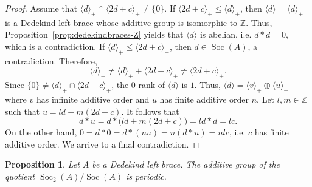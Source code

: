 \documentclass[12pt, a4paper, english]{article}
\newtheorem{proposicio}[teorema]{Proposition}
\theoremstyle{definition}
\DeclareMathOperator{\Soc}{Soc}
\begin{document}
\begin{proof}
Assume that $\langle d \rangle_+ \cap \langle 2d+c\rangle_+ \neq \{0\}$. If $\langle 2d + c \rangle_+ \leq \langle d \rangle_+$, then $\langle d \rangle = \langle d \rangle_+$ is a Dedekind left brace whose additive group is isomorphic to $\mathbb{Z}$. Thus, Proposition~\ref{prop:dedekindbraces-Z} yields that $\langle d \rangle$ is abelian, i.e. $d \ast d = 0$, which is a contradiction. If $\langle d \rangle_+ \leq \langle 2d +c \rangle_+$, then $d \in \Soc(A)$, a contradiction. Therefore, 
\[ \langle d \rangle_+ \neq \langle d \rangle_+ + \langle 2d+c \rangle_+ \neq \langle 2d+c \rangle_+.\] Since $\{0\} \neq \langle d \rangle_+ \cap \langle 2d+c \rangle_+$, the $0$-rank of $\langle d \rangle$ is $1$. Thus, $ \langle d \rangle = \langle v \rangle_+ \oplus \langle u \rangle_+$ where $v$ has infinite additive order and $u$ has finite additive order $n$. Let $l,m \in \mathbb{Z}$ such that  $u = ld + m(2d+c)$. It follows that
\[ d \ast u = d \ast \big(ld+ m(2d+c)\big) = ld \ast d = lc.\]
On the other hand,  $0 = d \ast 0 = d \ast(nu) = n(d\ast u) = nlc$, i.e. $c$ has finite additive order. We arrive to a final contradiction. 
\end{proof}


\begin{proposicio}
\label{prop:2.4nou}
Let $A$ be a Dedekind left brace. The additive group of the quotient $\Soc_2(A)/\Soc(A)$ is periodic.
\end{proposicio}
\end{document}
